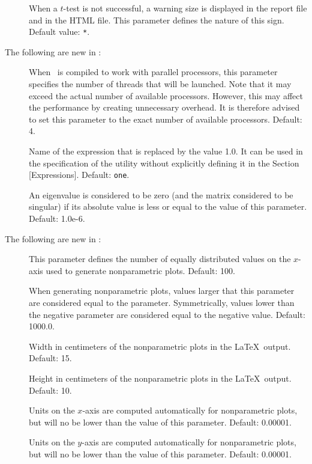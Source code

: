 \documentclass[12pt]{memoir}
\begin{document}
\begin{description}
\begin{description}
      \item[] When a $t$-test is not successful, a warning size is 
         displayed in the report file and in the HTML file. This parameter defines the nature 
         of this sign. Default value: \verb+*+.

   \end{description}


   The following are new in \BIOGEME :
\begin{description}
\item[] When \BIOGEME\ is compiled to
work with parallel processors, this parameter specifies the number of
threads that will be launched. Note that it may exceed the actual
number of available processors. However, this may affect the
performance by creating unnecessary overhead. It is therefore advised
to set this parameter to the exact number of available processors.
Default: 4.  
\item[] Name of the expression that is replaced by
the value 1.0. It can be used in the specification of the utility
without explicitly defining it in the Section
[Expressions]. Default: \texttt{one}.
\item[] An eigenvalue is considered
to be zero (and the matrix considered to be singular) if its absolute
value is less or equal to the value of this parameter. Default: 1.0e-6.
\end{description}

   The following are new in \BIOSIM :
\begin{description}
\item[] This parameter defines the
number of equally distributed values on the $x$-axis used to generate
nonparametric plots. Default: 100.
\item[] When generating nonparametric
plots, values larger that this
parameter are considered equal to the parameter. Symmetrically, values
lower than the negative parameter are considered equal to the negative
value.  Default: 1000.0.
\item[] Width in centimeters of the
nonparametric plots in the \LaTeX\ output. Default: 15. 
\item[] Height in centimeters of the
nonparametric plots in the \LaTeX\ output. Default: 10.
\item[] Units on the $x$-axis are computed
automatically for nonparametric plots, but will no be lower than the value
of this parameter. Default: 0.00001.
\item[] Units on the $y$-axis are computed
automatically for nonparametric plots, but will no be lower than the value
of this parameter. Default: 0.00001.
\end{description}




\end{description}
\end{document}
